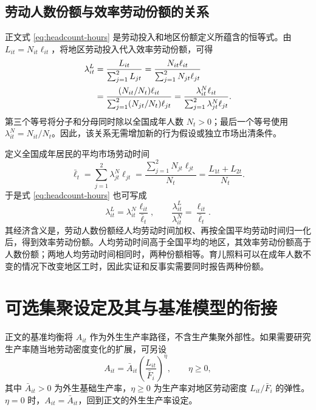 \documentclass[UTF8,a4paper,zihao=-4,fontset=windows]{ctexart}
\numberwithin{equation}{section}
\begin{document}
\subsection{劳动人数份额与效率劳动份额的关系}
\label{app:headcount-hours}

正文式 \eqref{eq:headcount-hours} 是劳动投入和地区份额定义所蕴含的恒等式。由 $L_{it}=N_{it}\ell_{it}$，将地区劳动投入代入效率劳动份额，可得
\begin{align}
  \lambda^L_{it}
   &=\frac{L_{it}}{\sum_{j=1}^2L_{jt}}
     =\frac{N_{it}\ell_{it}}{\sum_{j=1}^2N_{jt}\ell_{jt}}
       \notag\\
   &=\frac{(N_{it}/N_t)\ell_{it}}
           {\sum_{j=1}^2(N_{jt}/N_t)\ell_{jt}}
     =\frac{\lambda^N_{it}\ell_{it}}
           {\sum_{j=1}^2\lambda^N_{jt}\ell_{jt}}.
  \label{eq:app-share-derivation}
\end{align}
第三个等号将分子和分母同时除以全国成年人数 $N_t>0$；最后一个等号使用 $\lambda^N_{it}=N_{it}/N_t$。因此，该关系无需增加新的行为假设或独立市场出清条件。

定义全国成年居民的平均市场劳动时间
\begin{equation}
  \bar\ell_t
    =\sum_{j=1}^2\lambda^N_{jt}\ell_{jt}
    =\frac{\sum_{j=1}^2N_{jt}\ell_{jt}}{N_t}
    =\frac{L_{1t}+L_{2t}}{N_t}.
  \label{eq:app-national-average-hours}
\end{equation}
于是式 \eqref{eq:headcount-hours} 也可写成
\begin{equation}
  \lambda^L_{it}
     =\lambda^N_{it}\frac{\ell_{it}}{\bar\ell_t},\qquad
  \frac{\lambda^L_{it}}{\lambda^N_{it}}
     =\frac{\ell_{it}}{\bar\ell_t}.
  \label{eq:app-relative-hours-share}
\end{equation}
其经济含义是，劳动人数份额经人均劳动时间加权、再按全国平均劳动时间归一化后，得到效率劳动份额。人均劳动时间高于全国平均的地区，其效率劳动份额高于人数份额；两地人均劳动时间相同时，两种份额相等。育儿照料可以在成年人数不变的情况下改变地区工时，因此实证和反事实需要同时报告两种份额。

\section{可选集聚设定及其与基准模型的衔接}
\label{app:agglomeration}
正文的基准均衡将 $A_{it}$ 作为外生生产率路径，不含生产集聚外部性。如果需要研究生产率随当地劳动密度变化的扩展，可另设
\begin{equation}
  A_{it}=\bar A_{it}\left(\frac{L_{it}}{\bar F_i}\right)^{\eta},
  \qquad \eta\geq0,
  \label{eq:agglomeration-extension}
\end{equation}
其中 $\bar A_{it}>0$ 为外生基础生产率，$\eta\geq0$ 为生产率对地区劳动密度 $L_{it}/\bar F_i$ 的弹性。$\eta=0$ 时，$A_{it}=\bar A_{it}$，回到正文的外生生产率设定。
\end{document}
